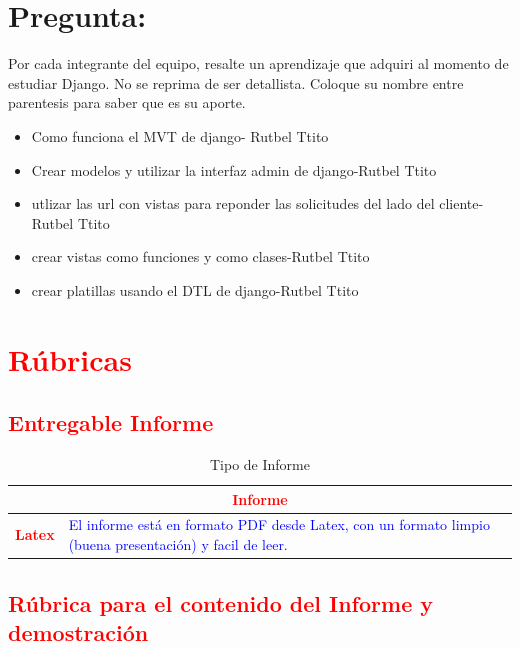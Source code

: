 \documentclass{article}
\begin{document}
\begin{itemize}
\end{itemize}

\section{Pregunta:}
Por cada integrante del equipo, resalte un aprendizaje que adquiri al momento de estudiar
Django. No se reprima de ser detallista. Coloque su nombre entre parentesis para saber que es
su aporte.
\begin{itemize}
	\item Como funciona el MVT de django- Rutbel Ttito
	\item Crear modelos y utilizar la interfaz admin de django-Rutbel Ttito
	\item utlizar las url con vistas para reponder las solicitudes del lado del cliente-Rutbel Ttito
	\item crear vistas como funciones y como clases-Rutbel Ttito
	\item crear platillas usando el DTL de django-Rutbel Ttito
\end{itemize}


\section{\textcolor{red}{Rúbricas}}
\subsection{\textcolor{red}{Entregable Informe}}
\begin{table}[H]
	\caption{Tipo de Informe}
	\setlength{\tabcolsep}{0.5em} %
	{\renewcommand{\arraystretch}{1.5}%

		\begin{tabular}{|p{3cm}|p{12cm}|}
			\hline
			\multicolumn{2}{|c|}{\textbf{\textcolor{red}{Informe}}}                                                                                                      \\
			\hline
			\textbf{\textcolor{red}{Latex}} & \textcolor{blue}{El informe está en formato PDF desde Latex,  con un formato limpio (buena presentación) y facil de leer.} \\
			\hline
		\end{tabular}
	}
\end{table}

\clearpage

\subsection{\textcolor{red}{Rúbrica para el contenido del Informe y demostración}}
\end{document}
